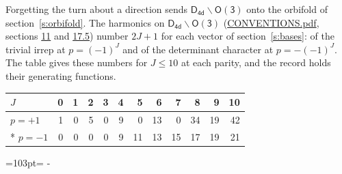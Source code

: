 \documentclass[10pt,a4paper]{article}
\newcommand{\needspace}[1]{\par\penalty-100\begingroup\dimen0=#1\relax\dimen2=\pagegoal
  \advance\dimen2-\pagetotal\ifdim\dimen0>\dimen2\relax\ifdim\dimen2>0pt\vfil\break\fi\fi
  \endgroup}
\numberwithin{equation}{section}
\newcommand{\grp}[1]{\mathsf{#1}}
\begin{document}
Forgetting the turn about a direction sends $\grp{D_{4d}}\backslash\grp{O(3)}$ onto the orbifold of section~\ref{s:orbifold}.
The harmonics on $\grp{D_{4d}}\backslash\grp{O(3)}$ (\href{../../CONVENTIONS.pdf}{CONVENTIONS.pdf}, sections \href{../../CONVENTIONS.pdf\#conv.11}{11} and \href{../../CONVENTIONS.pdf\#conv.17.5}{17.5}) number $2J + 1$ for each vector of section~\ref{s:bases}: of the trivial irrep at $p = (-1)^J$ and of the determinant character at $p = -(-1)^J$. The table gives these numbers for $J \le 10$ at each parity, and the record holds their generating functions.
{\small\setlength{\tabcolsep}{4pt}\begin{longtable}{@{}lrrrrrrrrrrr@{}}\toprule
$J$ & 0 & 1 & 2 & 3 & 4 & 5 & 6 & 7 & 8 & 9 & 10\\\midrule\endhead
\bottomrule\endfoot\endlastfoot
$p = +1$ & 1 & 0 & 5 & 0 & 9 & 0 & 13 & 0 & 34 & 19 & 42\\*
$p = -1$ & 0 & 0 & 0 & 0 & 9 & 11 & 13 & 15 & 17 & 19 & 21\\
\bottomrule\end{longtable}}
\needspace{103pt}
\end{document}
